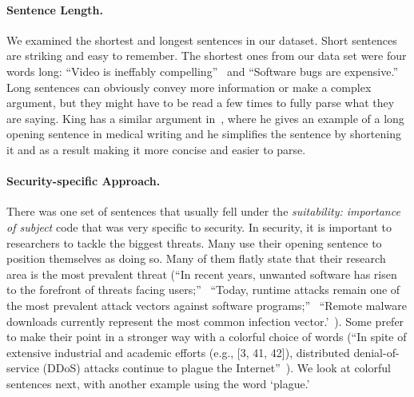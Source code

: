 \documentclass[sigconf,anonymous]{acmart}
\begin{document}
	\paragraph{Sentence Length.} We examined the shortest and longest sentences in our dataset. Short sentences are striking and easy to remember. The shortest ones from our data set were four words long: ``Video is ineffably compelling''~\cite{brocker2014iseeyou} and ``Software bugs are expensive.''~\cite{rebert2014optimizing} Long sentences can obviously convey more information or make a complex argument, but they might have to be read a few times to fully parse what they are saying. King has a similar argument in~\cite{king1967opening}, where he gives an example of a long opening sentence in medical writing and he simplifies the sentence by shortening it and as a result making it more concise and easier to parse.

	\paragraph{Security-specific Approach.} There was one set of sentences that usually fell under the \textit{suitability: importance of subject} code that was very specific to security. In security, it is important to researchers to tackle the biggest threats. Many use their opening sentence to position themselves as doing so. Many of them flatly state that their research area is the most prevalent threat (``In recent years, unwanted software has risen to the forefront of threats facing users;''~\cite{thomas2016investigating} ``Today, runtime attacks remain one of the most prevalent attack vectors against software programs;''~\cite{davi2014stitching} ``Remote malware downloads currently represent the most common infection vector.'~\cite{nelms2015webwitness}). Some prefer to make their point in a stronger way with a colorful choice of words (``In spite of extensive industrial and academic efforts (e.g., [3, 41, 42]), distributed denial-of-service (DDoS) attacks continue to plague the Internet''~\cite{fayaz2015bohatei}). We look at colorful sentences next, with another example using the word `plague.'
\end{document}
